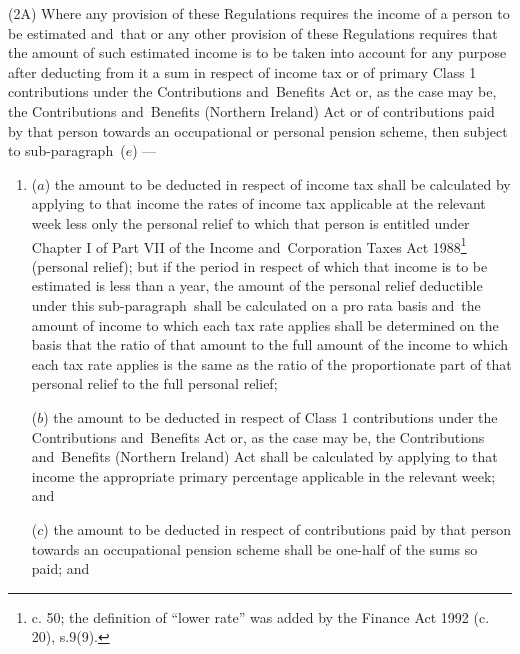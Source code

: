 \documentclass[12pt,a4paper]{article}
\begin{document}
(2A) Where any provision of these Regulations requires the income of a person to be estimated and~that or any other provision of these Regulations requires that the amount of such estimated income is to be taken into account for any purpose after deducting from it a sum in respect of income tax or of primary Class 1 contributions under the Contributions and~Benefits Act 
or, as the case may be, the Contributions and~Benefits (Northern Ireland) Act  %
or of contributions paid by that person towards an occupational or personal pension scheme, then
subject to sub-paragraph~($e$)%
---
\begin{enumerate}\item[]
($a$) the amount to be deducted in respect of income tax shall be calculated by applying to that income the rates of income tax applicable at the 
relevant week  %
less only the personal relief to which that person is entitled under Chapter I of Part VII of the Income and~Corporation Taxes Act 1988\footnote{ c. 50; the definition of “lower rate” was added by the Finance Act 1992 (c. 20), s.9(9).} (personal relief); but if the period in respect of which that income is to be estimated is less than a year, the amount of the personal relief deductible under this sub-paragraph~shall be calculated on a pro rata basis
and~the amount of income to which each tax rate applies shall be determined on the basis that the ratio of that amount to the full amount of the income to which each tax rate applies is the same as the ratio of the proportionate part of that personal relief to the full personal relief;  %

($b$) the amount to be deducted in respect of Class 1 contributions under the Contributions and~Benefits Act 
or, as the case may be, the Contributions and~Benefits (Northern Ireland) Act  %
shall be calculated by applying to that income the appropriate primary percentage applicable in the relevant week; and

($c$) the amount to be deducted in respect of contributions paid by that person towards an occupational 
pension scheme shall be one-half of the sums so 
paid; and~ %


\end{enumerate}
\end{document}
